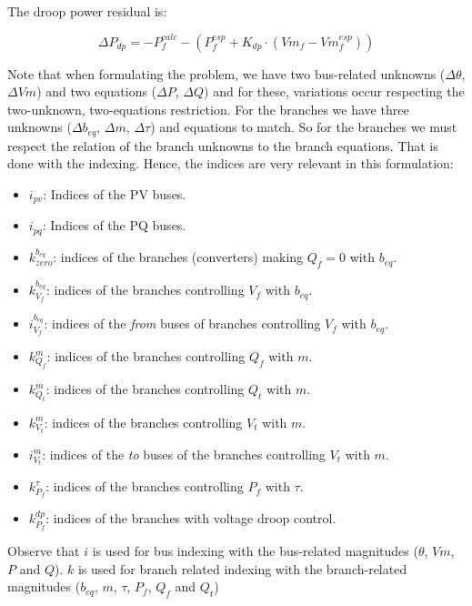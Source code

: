 \documentclass[11pt]{article}
\begin{document}
	
	
	The droop power residual is:
	
	\begin{equation}
		\Delta P_{dp} = -P_f^{calc} - (P_f^{esp} + K_{dp} \cdot ( Vm_{f} - Vm_{f}^{esp} ))
	\end{equation}
	
	
	Note that when formulating the problem, we have two bus-related unknowns ($\Delta \theta$, $\Delta Vm$) and two equations ($\Delta P$, $\Delta Q$) and for these, variations occur respecting the two-unknown, two-equations restriction. For the branches we have three unknowns ($\Delta b_{eq}$, $\Delta m$, $\Delta \tau$) and equations to match. So for the branches we must respect the relation of the branch unknowns to the branch equations. That is done with the indexing. Hence, the indices are very relevant in this formulation:
	
	\begin{itemize}
		
		\item $i_{pv}$: Indices of the PV buses.
		\item $i_{pq}$: Indices of the PQ buses.
		\item $k_{zero}^{b_{eq}}$: indices of the branches (converters) making $Q_f=0$ with $b_{eq}$.
		\item $k_{V_f}^{b_{eq}}$: indices of the branches controlling $V_f$ with $b_{eq}$.
		\item $i_{V_f}^{b_{eq}}$: indices of the \textit{from} buses of branches controlling $V_f$ with $b_{eq}$.
		
		\item $k_{Q_f}^m$: indices of the branches controlling $Q_f$ with $m$.
		\item $k_{Q_t}^m$: indices of the branches controlling $Q_t$ with $m$.
		\item $k_{V_t}^m$: indices of the branches controlling $V_t$ with $m$.
		
		\item $i_{V_t}^m$: indices of the \textit{to} buses of the branches controlling $V_t$ with $m$.
		
		\item $k_{P_f}^\tau$: indices of the branches controlling $P_f$ with $\tau$.
		\item $k_{P_f}^{dp}$: indices of the branches with voltage droop control.
	\end{itemize}
	
	Observe that $i$ is used for bus indexing with the bus-related magnitudes ($\theta$, $Vm$, $P$ and $Q$).
	$k$ is used for branch related indexing with the branch-related magnitudes ($b_{eq}$, $m$, $\tau$, $P_f$, $Q_f$ and $Q_t$)
	
\end{document}
